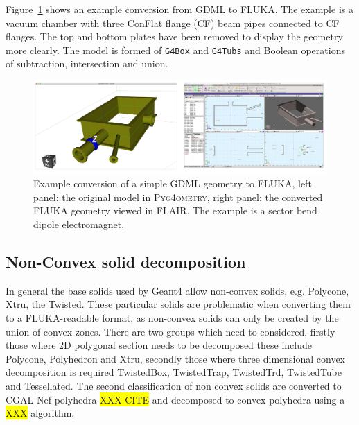 \documentclass[final,5p,times,twocolumn]{elsarticle}
\newcommand{\PYGEOMETRY}{\textsc{Pyg4ometry}}
\begin{document}
Figure~\ref{fig:gdml-flair} shows an example conversion from GDML to FLUKA. The example is a 
vacuum chamber with three ConFlat flange (CF) beam pipes connected to CF flanges. The top and bottom plates 
have been removed to display the geometry more clearly. The model is formed of \verb|G4Box| and
\verb|G4Tubs| and Boolean operations of subtraction, intersection and union.
\begin{figure}
\begin{center}
\includegraphics[width=1.0\textwidth]{./model-scene/CuboidalChamber.pdf}
\caption{Example conversion of a simple GDML geometry to FLUKA, left panel:  
the original model in \PYGEOMETRY{}, right panel: the converted FLUKA geometry 
viewed in FLAIR. The example is a sector bend dipole electromagnet.}
\label{fig:gdml-flair}
\end{center}
\end{figure}


\subsection{Non-Convex solid decomposition}
In general the base solids used by Geant4 allow non-convex solids, e.g. Polycone, Xtru, the Twisted.  These 
particular solids are problematic when converting them to a FLUKA-readable format, as non-convex solids 
can only be created by the union of convex zones. There are two groups which need to considered, firstly those 
where 2D polygonal section needs to be decomposed these include Polycone, Polyhedron and Xtru, secondly 
those where three dimensional convex decomposition is required  TwistedBox, TwistedTrap, TwistedTrd, 
TwistedTube and Tessellated. The second classification of non convex solids are converted to CGAL 
Nef polyhedra \colorbox{yellow}{XXX CITE} and decomposed to convex polyhedra using a 
\colorbox{yellow}{XXX} algorithm. 
\end{document}
